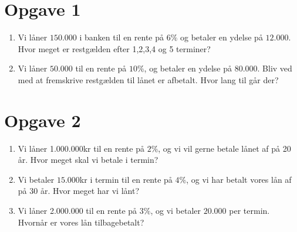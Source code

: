 \section*{Opgave 1}
\begin{enumerate}[label=\roman*)]
\item Vi låner $150.000$ i banken til en rente på $6\%$ og betaler en ydelse på $12.000$. Hvor meget er restgælden efter 1,2,3,4 og 5 terminer?
\item Vi låner $50.000$ til en rente på $10\%$, og betaler en ydelse på 80.000. Bliv ved med at fremskrive restgælden til lånet er afbetalt. Hvor lang til går der?
\end{enumerate}

\section*{Opgave 2}
\begin{enumerate}[label=\roman*)]
\item Vi låner 1.000.000kr til en rente på $2\%$, og vi vil gerne betale lånet af på 20 år. Hvor meget skal vi betale i termin?
\item Vi betaler $15.000$kr i termin til en rente på $4\%$, og vi har betalt vores lån af på 30 år. Hvor meget har vi lånt?
\item Vi låner 2.000.000 til en rente på $3\%$, og vi betaler $20.000$ per termin. Hvornår er vores lån tilbagebetalt?
\end{enumerate}